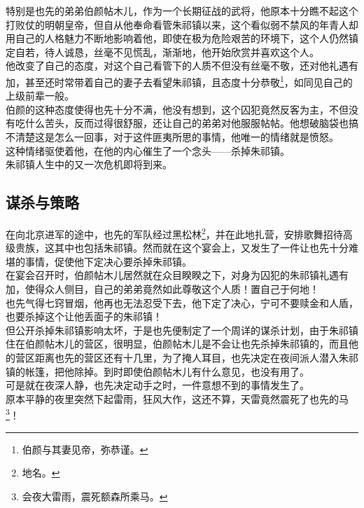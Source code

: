 \begin{multicols}{\theparacolNo}
特别是也先的弟弟伯颜帖木儿，作为一个长期征战的武将，他原本十分瞧不起这个打败仗的明朝皇帝，但自从他奉命看管朱祁镇以来，这个看似弱不禁风的年青人却用自己的人格魅力不断地影响着他，即使在极为危险艰苦的环境下，这个人仍然镇定自若，待人诚恳，丝毫不见慌乱，渐渐地，他开始欣赏并喜欢这个人。\\

他改变了自己的态度，对这个自己看管下的人质不但没有丝毫不敬，还对他礼遇有加，甚至还时常带着自己的妻子去看望朱祁镇，且态度十分恭敬\footnote{伯颜与其妻见帝，弥恭谨。}，如同见自己的上级前辈一般。\\

伯颜的这种态度使得也先十分不满，他没有想到，这个囚犯竟然反客为主，不但没有吃什么苦头，反而过得很舒服，还让自己的弟弟对他服服帖帖。他想破脑袋也搞不清楚这是怎么一回事，对于这件匪夷所思的事情，他唯一的情绪就是愤怒。\\

这种情绪驱使着他，在他的内心催生了一个念头——杀掉朱祁镇。\\

朱祁镇人生中的又一次危机即将到来。\\

\subsection{谋杀与策略}
在向北京进军的途中，也先的军队经过黑松林\footnote{地名。}，并在此地扎营，安排歌舞招待高级贵族，这其中也包括朱祁镇。然而就在这个宴会上，又发生了一件让也先十分难堪的事情，促使他下定决心要杀掉朱祁镇。\\

在宴会召开时，伯颜帖木儿居然就在众目睽睽之下，对身为囚犯的朱祁镇礼遇有加，使得众人侧目，自己的弟弟竟然如此尊敬这个人质！置自己于何地！\\

也先气得七窍冒烟，他再也无法忍受下去，他下定了决心，宁可不要赎金和人盾，也要杀掉这个让他丢面子的朱祁镇！\\

但公开杀掉朱祁镇影响太坏，于是也先便制定了一个周详的谋杀计划，由于朱祁镇住在伯颜帖木儿的营区，很明显，伯颜帖木儿是不会让也先杀掉朱祁镇的，而且他的营区距离也先的营区还有十几里，为了掩人耳目，也先决定在夜间派人潜入朱祁镇的帐篷，把他除掉。到时即使伯颜帖木儿有什么意见，也没有用了。\\

可是就在夜深人静，也先决定动手之时，一件意想不到的事情发生了。\\

原本平静的夜里突然下起雷雨，狂风大作，这还不算，天雷竟然震死了也先的马\footnote{会夜大雷雨，震死额森所乘马。}！\\


\end{multicols}
